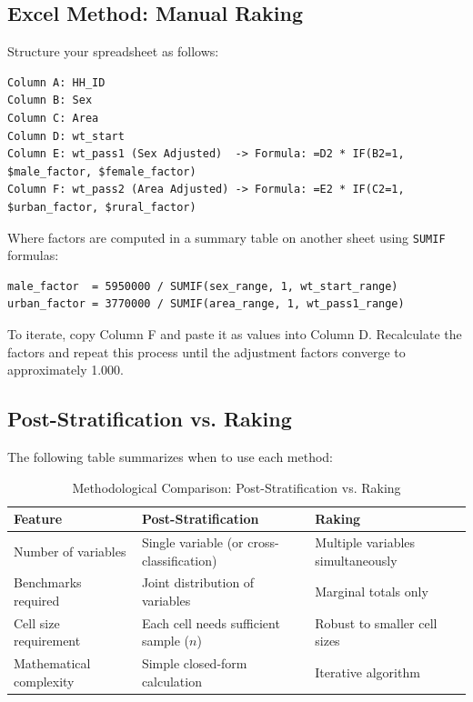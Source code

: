 \documentclass[11pt,a4paper]{article}
\begin{document}
\subsection{Excel Method: Manual Raking}
Structure your spreadsheet as follows:
\begin{lstlisting}[style=excel, caption={Excel Layout for Manual Raking}]
Column A: HH_ID
Column B: Sex
Column C: Area
Column D: wt_start
Column E: wt_pass1 (Sex Adjusted)  -> Formula: =D2 * IF(B2=1, $male_factor, $female_factor)
Column F: wt_pass2 (Area Adjusted) -> Formula: =E2 * IF(C2=1, $urban_factor, $rural_factor)
\end{lstlisting}
Where factors are computed in a summary table on another sheet using \texttt{SUMIF} formulas:
\begin{lstlisting}[style=excel]
male_factor  = 5950000 / SUMIF(sex_range, 1, wt_start_range)
urban_factor = 3770000 / SUMIF(area_range, 1, wt_pass1_range)
\end{lstlisting}
To iterate, copy Column F and paste it as values into Column D. Recalculate the factors and repeat this process until the adjustment factors converge to approximately 1.000.

\newpage

\subsection{Post-Stratification vs. Raking}
The following table summarizes when to use each method:

\begin{table}[htbp]
  \centering
  \caption{Methodological Comparison: Post-Stratification vs. Raking}
  \label{tab:ps_vs_raking}
  \begin{tabularx}{\textwidth}{lXX}
    \toprule
    \textbf{Feature} & \textbf{Post-Stratification} & \textbf{Raking} \\
    \midrule
    Number of variables & Single variable (or cross-classification) & Multiple variables simultaneously \\
    Benchmarks required & Joint distribution of variables & Marginal totals only \\
    Cell size requirement & Each cell needs sufficient sample ($n$) & Robust to smaller cell sizes \\
    Mathematical complexity & Simple closed-form calculation & Iterative algorithm \\
    \bottomrule
  \end{tabularx}
\end{table}
\end{document}
